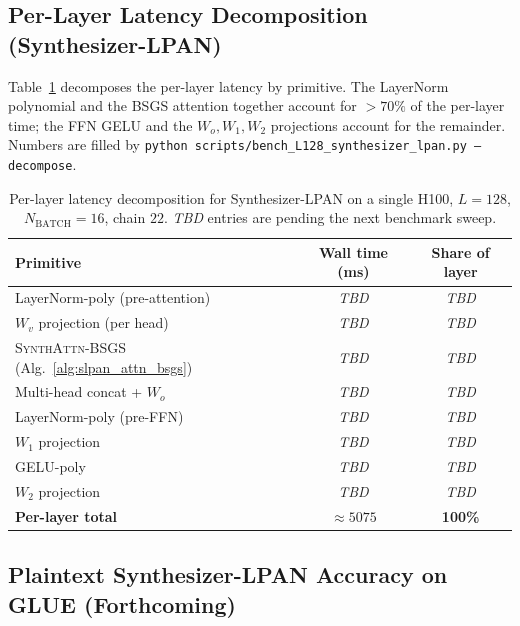\subsection{Per-Layer Latency Decomposition (Synthesizer-LPAN)}
Table~\ref{tab:slpan_layer_breakdown} decomposes the per-layer latency by primitive. The LayerNorm polynomial and the BSGS attention together account for $>70\%$ of the per-layer time; the FFN GELU and the $W_o, W_1, W_2$ projections account for the remainder. Numbers are filled by \texttt{python scripts/bench\_L128\_synthesizer\_lpan.py --decompose}.

\begin{table}[htbp]
\centering
\caption{Per-layer latency decomposition for Synthesizer-LPAN on a single H100, $L = 128$, $N_{\mathrm{BATCH}} = 16$, chain $22$. \textit{TBD} entries are pending the next benchmark sweep.}
\label{tab:slpan_layer_breakdown}
\begin{tabular}{lcc}
\toprule
\textbf{Primitive}                                & \textbf{Wall time (ms)} & \textbf{Share of layer} \\
\midrule
LayerNorm-poly (pre-attention)                    & \textit{TBD} & \textit{TBD} \\
$W_v$ projection (per head)                       & \textit{TBD} & \textit{TBD} \\
\textsc{SynthAttn-BSGS} (Alg.~\ref{alg:slpan_attn_bsgs}) & \textit{TBD} & \textit{TBD} \\
Multi-head concat + $W_o$                         & \textit{TBD} & \textit{TBD} \\
LayerNorm-poly (pre-FFN)                          & \textit{TBD} & \textit{TBD} \\
$W_1$ projection                                  & \textit{TBD} & \textit{TBD} \\
GELU-poly                                         & \textit{TBD} & \textit{TBD} \\
$W_2$ projection                                  & \textit{TBD} & \textit{TBD} \\
\midrule
\textbf{Per-layer total}                          & \textbf{$\approx 5075$} & \textbf{100\%} \\
\bottomrule
\end{tabular}
\end{table}

\subsection{Plaintext Synthesizer-LPAN Accuracy on GLUE (Forthcoming)}
\label{sec:slpan_glue}

